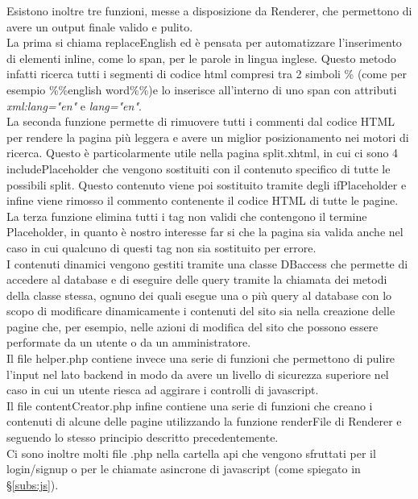 Esistono inoltre tre funzioni, messe a disposizione da Renderer, che permettono di avere un output finale valido e pulito.\\ La prima si chiama replaceEnglish ed è pensata per automatizzare l'inserimento di elementi inline, come lo span, per le parole in lingua
inglese. Questo metodo infatti ricerca tutti i segmenti di codice html compresi tra 2 simboli \% (come per esempio \%\%english word\%\%)e lo inserisce all'interno di uno span con attributi \textit{xml:lang="en"} e \textit{lang="en"}.\\ La seconda funzione permette
di rimuovere tutti i commenti dal codice HTML per rendere la pagina più leggera e avere un miglior posizionamento nei motori di ricerca. Questo è particolarmente utile nella pagina split.xhtml, in cui ci sono 4 includePlaceholder che vengono sostituiti con il 
contenuto specifico di tutte le possibili split. Questo contenuto viene poi sostituito tramite degli ifPlaceholder e infine viene rimosso il commento contenente il codice HTML di tutte le pagine.\\ La terza funzione elimina tutti i tag non validi che contengono 
il termine Placeholder, in quanto è nostro interesse far si che la pagina sia valida anche nel caso in cui qualcuno di questi tag non sia sostituito per errore.\\
I contenuti dinamici vengono gestiti tramite una classe DBaccess che permette di accedere al database e di eseguire delle query tramite la chiamata dei metodi della classe stessa, ognuno dei quali esegue una o più query al database con lo scopo di modificare 
dinamicamente i contenuti del sito sia nella creazione delle pagine che, per esempio, nelle azioni di modifica del sito che possono essere performate da un utente o da un amministratore.\\
Il file helper.php contiene invece una serie di funzioni che permettono di pulire l'input nel lato backend in modo da avere un livello di sicurezza superiore nel caso in cui un utente riesca ad aggirare i controlli di javascript.\\
Il file contentCreator.php infine contiene una serie di funzioni che creano i contenuti di alcune delle pagine utilizzando la funzione renderFile di Renderer e seguendo lo stesso principio descritto precedentemente.\\

Ci sono inoltre molti file .php nella cartella api che vengono sfruttati per il login/signup o per le chiamate asincrone di javascript (come spiegato in \S\ref{subs:js}).



